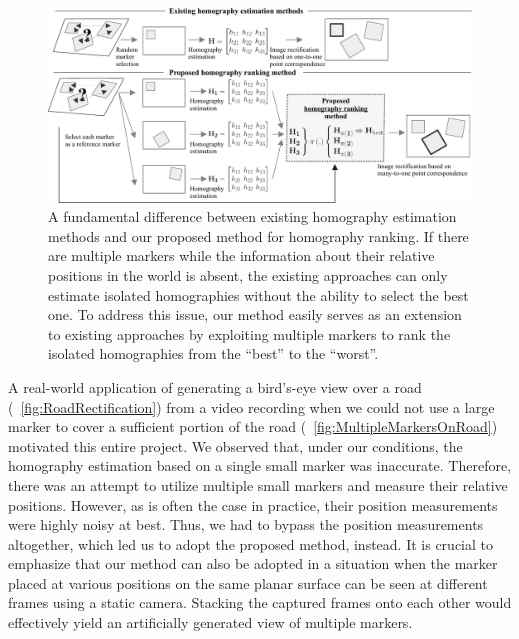 \begin{figure}[t]
    \centerline{\includegraphics[width=\linewidth]{figures/homography/motivation_diagram.pdf}}
    \caption[Homography ranking motivation diagram]{A fundamental difference between existing homography estimation methods and our proposed method for homography ranking. If there are multiple markers while the information about their relative positions in the world is absent, the existing approaches can only estimate isolated homographies without the ability to select the best one. To address this issue, our method easily serves as an extension to existing approaches by exploiting multiple markers to rank the isolated homographies from the ``best'' to the ``worst''.}
    \label{fig:HomographyMotivationDiagram}
\end{figure}

A real-world application of generating a bird's-eye view over a road (\figtext{}~\ref{fig:RoadRectification}) from a video recording when we could not use a large marker to cover a sufficient portion of the road (\figtext{}~\ref{fig:MultipleMarkersOnRoad}) motivated this entire project. We observed that, under our conditions, the homography estimation based on a single small marker was inaccurate. Therefore, there was an attempt to utilize multiple small markers and measure their relative positions. However, as is often the case in practice, their position measurements were highly noisy at best. Thus, we had to bypass the position measurements altogether, which led us to adopt the proposed method, instead. It is crucial to emphasize that our method can also be adopted in a situation when the marker placed at various positions on the same planar surface can be seen at different frames using a static camera. Stacking the captured frames onto each other would effectively yield an artificially generated view of multiple markers.

